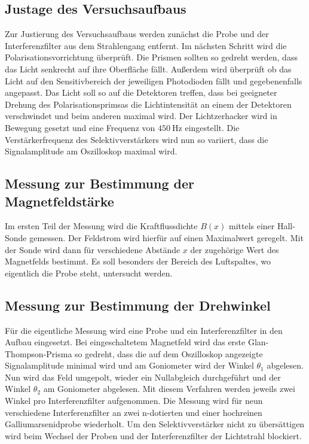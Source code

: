\subsection{Justage des Versuchsaufbaus}
\label{sub:Justage}

Zur Justierung des Versuchsaufbaus werden zunächst die Probe und der Interferenzfilter aus dem Strahlengang
entfernt.
Im nächsten Schritt wird die Polarisationsvorrichtung überprüft. Die Prismen sollten so gedreht werden, dass das Licht senkrecht auf ihre Oberfläche fällt.
Außerdem wird überprüft ob das Licht auf den Sensitivbereich der jeweiligen Photodioden fällt und gegebenenfalls angepasst.
Das Licht soll so auf die Detektoren treffen, dass bei geeigneter Drehung des Polarisationsprimsas die Lichtintensität an einem der Detektoren verschwindet und beim anderen maximal wird.
Der Lichtzerhacker wird in Bewegung gesetzt und eine Frequenz von $\qty{450}{\hertz}$ eingestellt.
Die Verstärkerfrequenz des Selektivverstärkers wird nun so variiert, dass die Signalamplitude am Oszilloskop maximal wird.




\subsection{Messung zur Bestimmung der Magnetfeldstärke}
\label{sub:Magnetfeld}

Im ersten Teil der Messung wird die Kraftflussdichte $B(x)$ mittels einer Hall-Sonde gemessen.
Der Feldstrom wird hierfür auf einen Maximalwert geregelt. Mit der Sonde wird dann für verschiedene Abstände $x$ der zugehörige
Wert des Magnetfelds bestimmt. Es soll besonders der Bereich des Luftspaltes, wo eigentlich die Probe steht, untersucht werden.


\subsection{Messung zur Bestimmung der Drehwinkel}
\label{sub:Drehwinkel}

Für die eigentliche Messung wird eine Probe und ein Interferenzfilter in den Aufbau eingesetzt. Bei eingeschaltetem Magnetfeld wird das erste Glan-Thompson-Prisma
so gedreht, dass die auf dem Oszilloskop angezeigte Signalamplitude minimal wird und am Goniometer wird der Winkel $\theta_1$ abgelesen.
Nun wird das Feld umgepolt, wieder ein Nullabgleich durchgeführt und der Winkel $\theta_2$ am Goniometer abgelesen.
Mit diesem Verfahren werden jeweils zwei Winkel pro Interferenzfilter aufgenommen. Die Messung wird für neun verschiedene Interferenzfilter
an zwei n-dotierten und einer hochreinen Galliumarsenidprobe wiederholt.
Um den Selektivverstärker nicht zu übersättigen wird beim Wechsel der Proben und der Interferenzfilter der Lichtstrahl blockiert.






